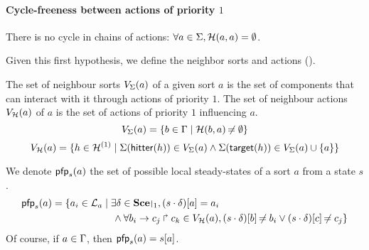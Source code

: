 \paragraph{Cycle-freeness between actions of priority $1$}
There is no cycle in chains of actions: $\forall a \in \Sigma, \mathcal{H}(a, a) = \emptyset$.

Given this first hypothesis, we define the neighbor  sorts and actions ().
\begin{definition}
\label{def:neighbors}
  The set of neighbour sorts $V_\Sigma(a)$ of a given sort $a$ is the set of components that can interact with it through actions of priority $1$.
  The set of neighbour actions $V_{\mathcal{H}}(a)$ of $a$ is the set of actions of priority $1$ influencing $a$.
  $$V_\Sigma(a) = \{ b \in \Gamma \mid \mathcal{H}(b, a) \not\nobreak\mkern -2mu = \emptyset \}$$
  $$V_{\mathcal{H}}(a) = \{ h \in \mathcal{H}^{(1)} \mid \Sigma(\mathsf{hitter}(h)) \in V_\Sigma(a) \wedge \Sigma(\mathsf{target}(h)) \in V_\Sigma(a) \cup \{ a \} \}$$
\end{definition}

We denote $\mathsf{pfp}_s(a)$ the set of possible local steady-states of a sort $a$ from a state $s$.
\begin{align*}
  \pfp_s(a) = \{ a_i \in \PHl_a &\mid \exists \delta \in \restriction{\Sce}{1}, \PHget{(s \PHplay \delta)}{a} = a_i \\
  & \quad \wedge \forall \PHhit{b_i}{c_j}{c_k} \in \Vh(a), \PHget{(s \PHplay \delta)}{b} \neq b_i \vee \PHget{(s \PHplay \delta)}{c} \neq c_j \}
\end{align*}
Of course, if $a \in \Gamma$, then $\mathsf{pfp}_s(a) = {s[a]}$.

